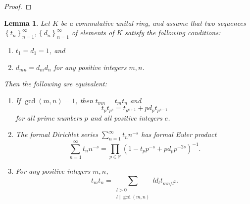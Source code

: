 \documentclass[10pt,leqno,twoside]{article}
\theoremstyle{plain}
\newtheorem{lemma}[lem]{Lemma}
\theoremstyle{definition}
\numberwithin{equation}{section}
\numberwithin{lem}{section}
\newcommand{\cbr}[1]{\left\{#1\right\}}
\newcommand{\textib}[1]{\textbf{\textit{#1\index{#1}}}} %
\newcommand{\tbd}{{\Huge\color{red}{\textib{TO DO}}}}
\begin{document}
\begin{proof}
    \tbd
\end{proof}
\begin{lemma}\label{lem: miyake lem 4.5.12}
    Let $K$ be a commutative unital ring, and assume that two sequences $\cbr{t_n}_{n=1}^\infty,\cbr{d_n}_{n=1}^\infty$ of elements of $K$ satisfy the following conditions:
    \begin{enumerate}[label=\textup{(\roman*)}]
        \item $t_1 =d_1 = 1$, and 
        \item $d_{mn} = d_md_n$ for any positive integers $m,n$.
    \end{enumerate} Then the following are equivalent:
    \begin{enumerate}[label=\textup{(\arabic*)}]
        \item If $\gcd(m,n) = 1$, then $t_{mn} = t_mt_n$ and \[t_pt_{p^e} = t_{p^{e+1}} + pd_pt_{p^{e-1}}\] for all prime numbers $p$ and all positive integers $e$.
        \item The formal Dirichlet series $\sum_{n=1}^\infty t_nn^{-s}$ has formal Euler product \[\sum_{n=1}^\infty t_nn^{-s} = \prod_{p\in\mathbb P}(1-t_pp^{-s} + pd_pp^{-2s})^{-1}.\]
        \item For any positive integers $m,n$, \[t_mt_n = \sum_{\substack{l>0\\l\mid \gcd(m,n)}}ld_lt_{mn/l^2}.\]
    \end{enumerate}
\end{lemma}
\end{document}
